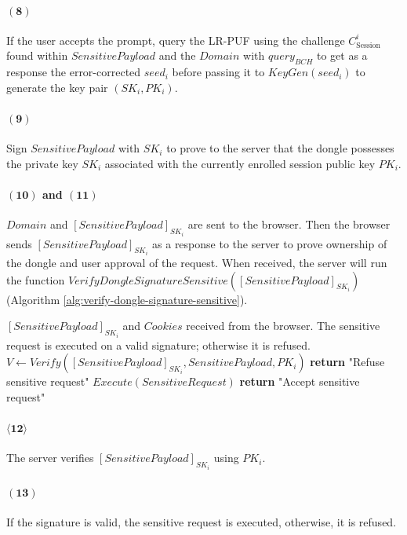 \paragraph{$\boldsymbol{(8)}$}If the user accepts the prompt, query the LR-PUF using the challenge $C_\text{Session}^i$ found within $SensitivePayload$ and the $Domain$ with $query_{BCH}$ to get as a response the error-corrected $seed_i$ before passing it to $KeyGen(seed_i)$ to generate the key pair $(SK_i,PK_i)$.
\paragraph{$\boldsymbol{(9)}$} Sign $SensitivePayload$ with $SK_i$ to prove to the server that the dongle possesses the private key $SK_i$ associated with the currently enrolled session public key $PK_i$.
\paragraph{$\boldsymbol{(10)}$ and $\boldsymbol{(11)}$} $Domain$ and $[SensitivePayload]_{SK_i}$ are sent to the browser. Then the browser sends $[SensitivePayload]_{SK_i}$ as a response to the server to prove ownership of the dongle and user approval of the request. When received, the server will run the function $VerifyDongleSignatureSensitive([SensitivePayload]_{SK_i})$ (Algorithm \ref{alg:verify-dongle-signature-sensitive}).
\begin{algorithm}[ht!]
\caption{$VerifyDongleSignatureSensitive([SensitivePayload]_{SK_i})$}
\begin{algorithmic}[1]
    \Require $[SensitivePayload]_{SK_i}$ and $Cookies$ received from the browser.
    \Ensure  The sensitive request is executed on a valid signature;
             otherwise it is refused.
    \State $V \leftarrow Verify([SensitivePayload]_{SK_i}, SensitivePayload, PK_i)$
        \State \textbf{return} "Refuse sensitive request"
    \EndIf
    \State $Execute(SensitiveRequest)$
    \State \textbf{return} "Accept sensitive request"
\end{algorithmic}
\label{alg:verify-dongle-signature-sensitive}
\end{algorithm}
\paragraph{$\boldsymbol{\langle12\rangle}$} The server verifies $[SensitivePayload]_{SK_i}$ using $PK_i$.
\paragraph{$\boldsymbol{(13)}$} If the signature is valid, the sensitive request is executed, otherwise, it is refused.

